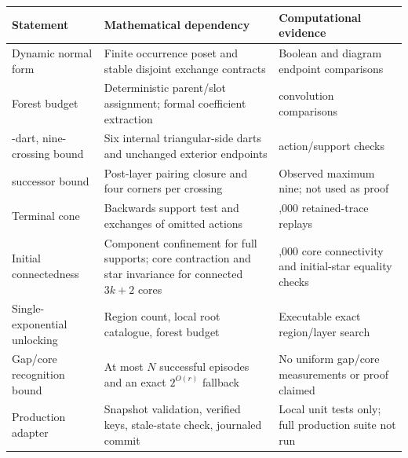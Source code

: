 \documentclass[11pt]{article}
\theoremstyle{definition}
\begin{document}
\begin{longtable}{>{\raggedright\arraybackslash}p{}>{\raggedright\arraybackslash}p{}>{\raggedright\arraybackslash}p{}}
\toprule
Statement & Mathematical dependency & Computational evidence\\
\midrule
\endhead
Dynamic normal form & Finite occurrence poset and stable disjoint exchange
contracts & Boolean and diagram endpoint comparisons\\
Forest budget & Deterministic parent/slot assignment; formal coefficient
extraction & 651 convolution comparisons\\
18-dart, nine-crossing bound & Six internal triangular-side darts and
unchanged exterior endpoints & 821 action/support checks\\
36 successor bound & Post-layer pairing closure and four corners per crossing
& Observed maximum nine; not used as proof\\
Terminal cone & Backwards support test and exchanges of omitted actions
& 1,000 retained-trace replays\\
Initial connectedness & Component confinement for full supports; core
contraction and star invariance for connected $3k+2$ cores & 1,000 core
connectivity and initial-star equality checks\\
Single-exponential unlocking & Region count, local root catalogue, forest
budget & Executable exact region/layer search\\
Gap/core recognition bound & At most $N$ successful episodes and an exact
$2^{O(r)}$ fallback & No uniform gap/core measurements or proof claimed\\
Production adapter & Snapshot validation, verified keys, stale-state check,
journaled commit & Local unit tests only; full production suite not run\\
\bottomrule
\end{longtable}
\end{document}
